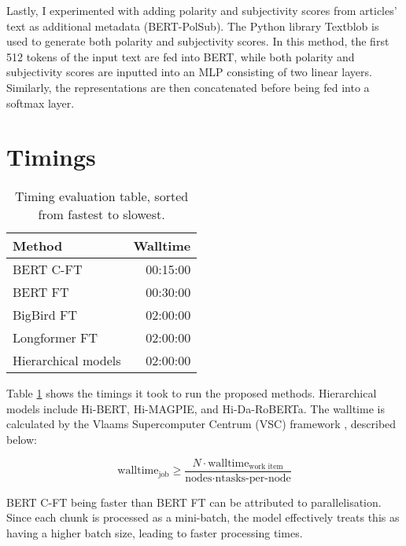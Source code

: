 Lastly, I experimented with adding polarity and subjectivity scores from articles' text as additional metadata (BERT-PolSub). The Python library Textblob \cite{loria-2018-textblob} is used to generate both polarity and subjectivity scores. In this method, the first 512 tokens of the input text are fed into BERT, while both polarity and subjectivity scores are inputted into an MLP consisting of two linear layers. Similarly, the representations are then concatenated before being fed into a softmax layer.

\section{Timings}

\begin{table}[htbp]
    \centering
    \begin{tabular}{| l | r |}
        \hline                            \textbf{Method} & \textbf{Walltime} \\
        \hline
        BERT C-FT                                         & 00:15:00          \\
        \hline
        BERT FT                                           & 00:30:00          \\
        \hline
        BigBird FT                                        & 02:00:00          \\
        \hline
        Longformer FT                                     & 02:00:00          \\
        \hline
        Hierarchical models                               & 02:00:00          \\
        \hline
    \end{tabular}
    \caption{Timing evaluation table, sorted from fastest to slowest.}
    \label{table:eval_timings}
\end{table}

Table \ref{table:eval_timings} shows the timings it took to run the proposed methods. Hierarchical models include Hi-BERT, Hi-MAGPIE, and Hi-Da-RoBERTa. The walltime is calculated by the Vlaams Supercomputer Centrum (VSC) framework \cite{vscentrum}, described below:

\[
    \text{walltime}_{\text{job}} \geq \frac{N \cdot \text{walltime}_{\text{work item}}}{\text{nodes} \cdot \text{ntasks-per-node}}
\]

BERT C-FT being faster than BERT FT can be attributed to parallelisation. Since each chunk is processed as a mini-batch, the model effectively treats this as having a higher batch size, leading to faster processing times.


